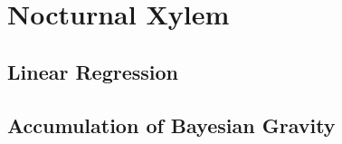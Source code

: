 \chapter{Nocturnal Xylem}

\section{Linear Regression}
\lipsum[1-5]

\section{Accumulation of Bayesian Gravity}
\lipsum[1-4]